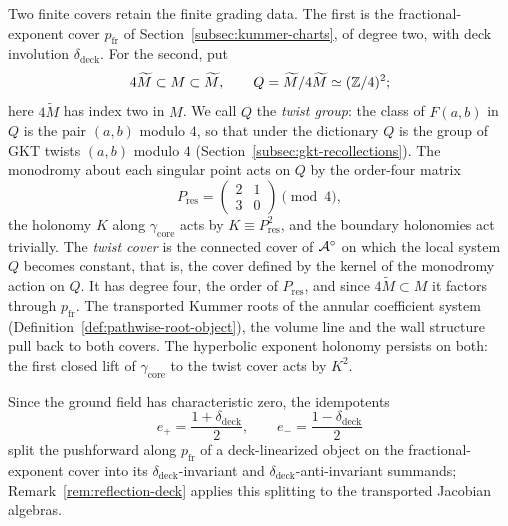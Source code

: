 Two finite covers retain the finite grading data.  The first is the
fractional-exponent cover $p_{\mathrm{fr}}$ of
Section~\ref{subsec:kummer-charts}, of degree two, with deck involution
$\delta_{\mathrm{deck}}$.  For the second, put
\begin{equation}\label{eq:GKT-residue-group}
 4\widetilde M\subset M\subset\widetilde M,
 \qquad
 Q=\widetilde M/4\widetilde M\simeq(\mathbb Z/4)^2;
\end{equation}
here $4\widetilde M$ has index two in $M$.  We call $Q$ the \emph{twist
group}: the class of $F(a,b)$ in $Q$ is the pair $(a,b)$ modulo $4$, so that
under the dictionary $Q$ is the group of GKT twists $(a,b)$ modulo $4$
(Section~\ref{subsec:gkt-recollections}).  The monodromy about each singular
point acts on $Q$ by the order-four matrix
\begin{equation}\label{eq:residue-matrix}
 P_{\mathrm{res}}=\begin{pmatrix}2&1\\3&0\end{pmatrix}\pmod4,
\end{equation}
the holonomy $K$ along $\gamma_{\mathrm{core}}$ acts by
$K\equiv P_{\mathrm{res}}^2$, and the boundary
holonomies act trivially.  The \emph{twist cover} is the connected cover of
$\mathcal A^\circ$ on which the local system $Q$ becomes constant, that is, the
cover defined by the kernel of the monodromy action on $Q$.  It has degree
four, the order of $P_{\mathrm{res}}$, and since $4\widetilde M\subset M$ it
factors through $p_{\mathrm{fr}}$.  The transported Kummer roots of the
annular coefficient system (Definition~\ref{def:pathwise-root-object}), the
volume line and the wall structure pull back to both covers.  The hyperbolic
exponent holonomy persists on both: the first closed lift of
$\gamma_{\mathrm{core}}$ to the twist cover acts by $K^2$.

Since the ground field has characteristic zero, the idempotents
\[
 e_+=\frac{1+\delta_{\mathrm{deck}}}{2},
 \qquad e_-=\frac{1-\delta_{\mathrm{deck}}}{2}
\]
split the pushforward along $p_{\mathrm{fr}}$ of a deck-linearized object on
the fractional-exponent cover into its $\delta_{\mathrm{deck}}$-invariant and
$\delta_{\mathrm{deck}}$-anti-invariant summands;
Remark~\ref{rem:reflection-deck} applies this splitting to the transported
Jacobian algebras.
